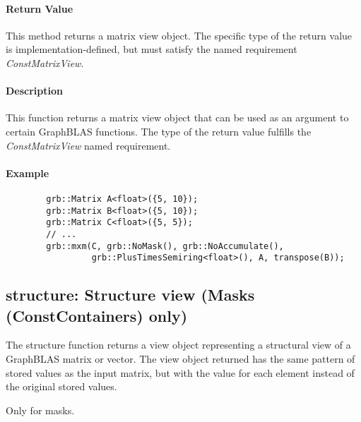 \paragraph{Return Value}

This method returns a matrix view object.  The specific type of the return value is implementation-defined, but must satisfy the named requirement \emph{ConstMatrixView}.

\paragraph{Description}

This function returns a matrix view object that can be used as an argument to certain GraphBLAS functions.
The type of the return value fulfills the \emph{ConstMatrixView} named requirement.

\paragraph{Example}

\begin{verbatim}
        grb::Matrix A<float>({5, 10});
        grb::Matrix B<float>({5, 10});
        grb::Matrix C<float>({5, 5});
        // ...
        grb::mxm(C, grb::NoMask(), grb::NoAccumulate(), 
                 grb::PlusTimesSemiring<float>(), A, transpose(B));
\end{verbatim}


\subsection{{\sf structure}: Structure view (Masks (ConstContainers) only)}

The {\sf structure} function returns a view object representing a structural
view of a GraphBLAS matrix or vector.  The view object returned has the same
pattern of stored values as the input matrix, but with the value 
for each element instead of the original stored values.

Only for masks.


\paragraph{\syntax}

